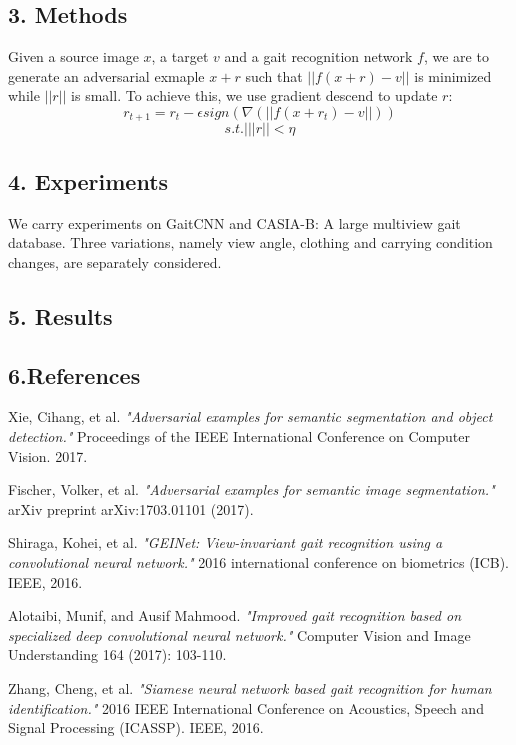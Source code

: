 \documentclass[letterpaper]{article} %
\begin{document}
\subsection{3. Methods}
Given a source image $x$, a target $v$ and a gait recognition network $f$, we are to generate an adversarial exmaple $x+r$ such that $||f(x+r)-v||$ is minimized while $||r||$ is small. To achieve this, we use gradient descend to update $r$:
$$r_{t+1}= r_t - \epsilon sign(\nabla(||f(x+r_t)-v||))$$
$$s.t. |||r||<\eta$$



\subsection{4. Experiments}

We carry experiments on GaitCNN and CASIA-B: A large multiview gait database. Three variations, namely view angle, clothing and carrying condition changes, are separately considered.

 


\subsection{5. Results}

\subsection{6.References}
\smallskip \noindent
[1] Xie, Cihang, et al. \textit{"Adversarial examples for semantic segmentation and object detection."} Proceedings of the IEEE International Conference on Computer Vision. 2017.

\smallskip \noindent
[2] Fischer, Volker, et al. \textit{"Adversarial examples for semantic image segmentation."} arXiv preprint arXiv:1703.01101 (2017).

\smallskip \noindent
[3] Shiraga, Kohei, et al. \textit{"GEINet: View-invariant gait recognition using a convolutional neural network."} 2016 international conference on biometrics (ICB). IEEE, 2016.

\smallskip \noindent
[4] Alotaibi, Munif, and Ausif Mahmood. \textit{"Improved gait recognition based on specialized deep convolutional neural network."}  Computer Vision and Image Understanding 164 (2017): 103-110.

\smallskip \noindent
[5] Zhang, Cheng, et al. \textit{"Siamese neural network based gait recognition for human identification."} 2016 IEEE International Conference on Acoustics, Speech and Signal Processing (ICASSP). IEEE, 2016.
\end{document}

